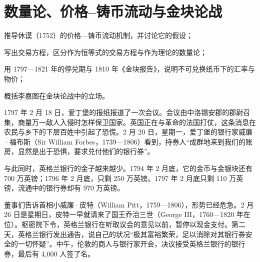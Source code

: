 \chapter{数量论、价格–铸币流动与金块论战}\label{ch:bullion}

\begin{chapterguide}
\begin{guidegoals}
\item 推导休谟（1752）的价格—铸币流动机制，并讨论它的假设；
\item 写出交易方程，区分作为恒等式的交易方程与作为理论的数量论；
\item 用 1797—1821 年的停兑期与 1810 年《金块报告》，说明不可兑换纸币下的汇率与物价；
\item 概括李嘉图在金块论战中的立场。
\end{guidegoals}
\end{chapterguide}

1797 年 2 月 18 日，爱丁堡的报纸报道了一次会议。会议由中洛锡安郡的郡尉召集，商量万一敌人入侵时怎样保卫国家。英国正在与革命的法国打仗，这条消息在农民与乡下的下层百姓中引起了恐慌\cite{cannan1919}。2 月 20 日，星期一，爱丁堡的银行家威廉·福布斯（Sir William Forbes，1739—1806）看到，持券人“成群地来到我们的账房，显然是出于恐惧，要求兑付他们的银行券”\cite{cannan1919}。

与此同时，英格兰银行的金子越来越少。1794 年 2 月底，它的金币与金银块还有 700 万英镑；1796 年 2 月底，只剩 250 万英镑。1797 年 2 月底只剩 110 万英镑，流通中的银行券却有 970 万英镑\cite{cannan1919}。

董事们告诉首相小威廉·皮特（William Pitt，1759—1806），形势已经危急\cite{cannan1919}。2 月 26 日是星期日，皮特一早就请来了国王乔治三世（George III，1760—1820 年在位）。枢密院下令，英格兰银行在听取议会的意见以前，暂停以现金支付\cite{cannan1919}。第二天，英格兰银行发出通告，说自己的状况“极其富裕繁荣，足以消除对其银行券安全的一切怀疑”\cite{cannan1919}。中午，伦敦的商人与银行家开会，决议接受英格兰银行的银行券，最后有 4,000 人签了名\cite{cannan1919}。


